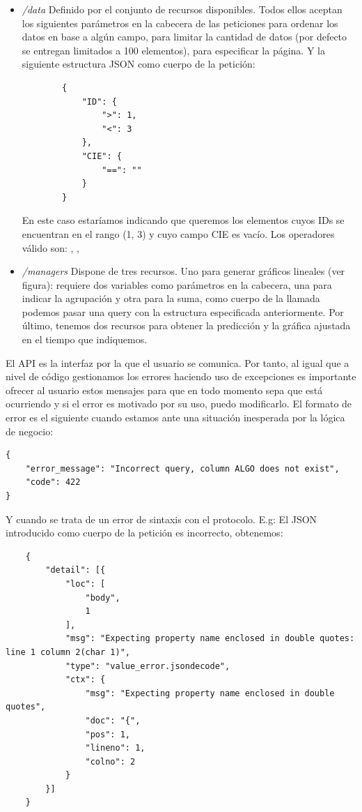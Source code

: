 \begin{itemize}
    \item \textit{/data} Definido por el conjunto de recursos disponibles. Todos ellos
    aceptan los siguientes parámetros en la cabecera de las peticiones 
    para ordenar los datos en base a algún campo,  para limitar la
    cantidad de datos (por defecto se entregan limitados a 100 elementos), 
    para especificar la página. Y la siguiente estructura JSON como cuerpo de la petición:
    \begin{verbatim}
        {
            "ID": {
                ">": 1,
                "<": 3
            },
            "CIE": {
                "==": ""
            }
        }
    \end{verbatim}
    En este caso estaríamos indicando que queremos los elementos cuyos IDs se encuentran
    en el rango (1, 3) y cuyo campo CIE es vacío. Los operadores válido son:
    \codeword{==}, \codeword{<}, \codeword{>}

    \item \textit{/managers} Dispone de tres recursos. Uno para generar gráficos lineales
    (ver figura): requiere dos variables como parámetros en la cabecera, una para indicar
    la agrupación y otra para la suma, como cuerpo de la llamada podemos pasar una query
    con la estructura especificada anteriormente. Por último, tenemos dos recursos para
    obtener la predicción y la gráfica ajustada en el tiempo que indiquemos.
\end{itemize}

El API es la interfaz por la que el usuario se comunica. Por tanto, al igual que a nivel
de código gestionamos los errores haciendo uso de excepciones es importante ofrecer al
usuario estos mensajes para que en todo momento sepa que está ocurriendo y si el error es
motivado por su uso, puedo modificarlo. El formato de error es el siguiente cuando estamos
ante una situación inesperada por la lógica de negocio:
\begin{verbatim}
{
    "error_message": "Incorrect query, column ALGO does not exist",
    "code": 422
}
\end{verbatim}
Y cuando se trata de un error de sintaxis con el protocolo. E.g: El JSON introducido como
cuerpo de la petición es incorrecto, obtenemos:
\begin{verbatim}
    {
        "detail": [{
            "loc": [
                "body",
                1
            ],
            "msg": "Expecting property name enclosed in double quotes: line 1 column 2(char 1)",
            "type": "value_error.jsondecode",
            "ctx": {
                "msg": "Expecting property name enclosed in double quotes",
                "doc": "{",
                "pos": 1,
                "lineno": 1,
                "colno": 2
            }
        }]
    }
\end{verbatim}

